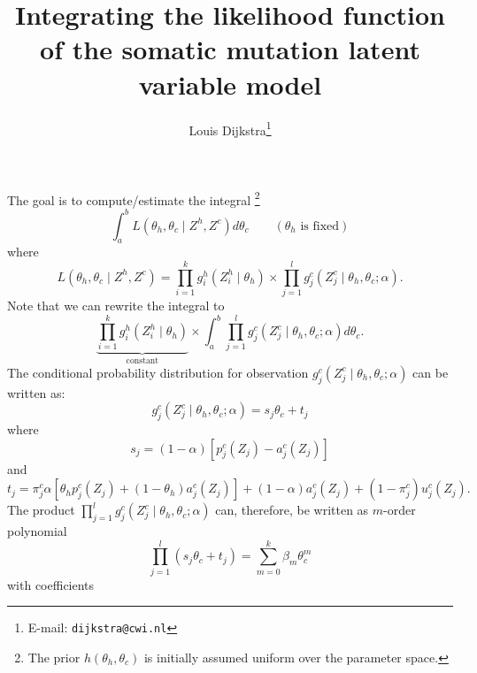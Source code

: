 \documentclass[12pt,a4paper]{article}
\numberwithin{equation}{section}
\begin{document}
\title{Integrating the likelihood function of the somatic mutation latent variable model}
\author{Louis Dijkstra\footnote{E-mail: \texttt{dijkstra@cwi.nl}}}

\maketitle

The goal is to compute/estimate the integral \footnote{The prior $h(\theta_h, \theta_c)$ is initially assumed uniform over the parameter space.}
\begin{equation}
 \int_a^b L(\theta_h, \theta_c \mid Z^h, Z^c) d\theta_c \qquad (\theta_h \text{ is fixed})
\end{equation}
where 
\begin{equation}
 L(\theta_h, \theta_c \mid Z^h, Z^c) = \prod_{i=1}^k g_i^h\left(Z^h_i \mid \theta_h \right) \times \prod_{j=1}^l g_j^c \left(Z_j^c \mid \theta_h, \theta_c; \alpha \right).
 \end{equation}
Note that we can rewrite the integral to 
\begin{equation}
  \underbrace{\prod_{i=1}^k g_i^h\left(Z^h_i \mid \theta_h \right)}_{\text{constant}} \times \int_a^b \prod_{j=1}^l g_j^c \left(Z_j^c \mid \theta_h, \theta_c; \alpha \right) d\theta_c. 
\label{eq:int}
  \end{equation}
The conditional probability distribution for observation $g_j^c \left(Z_j^c \mid \theta_h, \theta_c; \alpha \right)$ can be written as: 
\begin{equation}
 g_j^c \left(Z_j^c \mid \theta_h, \theta_c; \alpha \right) = s_j \theta_c + t_j
\end{equation}
where 
\begin{equation}
 s_j = (1 - \alpha)\left[p_j^c\left(Z_j\right) - a_j^c\left(Z_j \right) \right]
\end{equation}
and 
\begin{equation}
 t_j =   \pi_j^c \alpha \left[\theta_h p_j^c\left(Z_j\right) + \left(1 - \theta_h \right) a_j^c\left(Z_j \right) \right] + (1 - \alpha)a_j^c\left(Z_j \right) + \left(1 - \pi_j^c\right) u_j^c \left(Z_j \right).
\end{equation}
The product $\prod_{j=1}^l g_j^c \left(Z_j^c \mid \theta_h, \theta_c; \alpha \right)$ can, therefore, be written as $m$-order polynomial
\begin{equation}
 \prod_{j=1}^l \left(s_j \theta_c + t_j\right) = \sum_{m=0}^k \beta_m \theta_c^m
\end{equation}
with coefficients 
\end{document}
